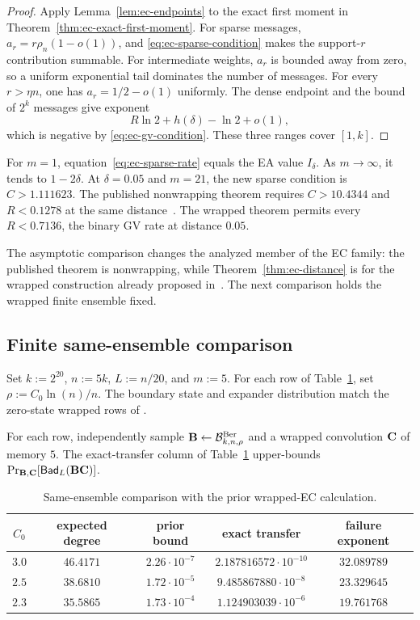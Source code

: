 \begin{proof}
Apply Lemma~\ref{lem:ec-endpoints} to the exact first moment in
Theorem~\ref{thm:ec-exact-first-moment}.  For sparse messages,
$a_r=r\rho_n(1-o(1))$, and \eqref{eq:ec-sparse-condition} makes the
support-$r$ contribution summable.  For intermediate weights, $a_r$ is
bounded away from zero, so a uniform exponential tail dominates the number
of messages.  For every $r>\eta n$, one has $a_r=1/2-o(1)$ uniformly.  The
dense endpoint and the bound of $2^k$ messages give exponent
\[
 R\ln2+h(\delta)-\ln2+o(1),
\]
which is negative by \eqref{eq:ec-gv-condition}.  These three ranges cover
$[1,k]$.
\end{proof}

For $m=1$, equation~\eqref{eq:ec-sparse-rate} equals the EA value
$I_\delta$.  As $m\to\infty$, it tends to $1-2\delta$.  At
$\delta=0.05$ and $m=21$, the new sparse condition is $C>1.111623$.
The published nonwrapping theorem requires $C>10.4344$ and $R<0.1278$ at the
same distance~\cite{EC}.  The wrapped theorem permits every $R<0.7136$, the
binary GV rate at distance $0.05$.

The asymptotic comparison changes the analyzed member of the EC family: the
published theorem is nonwrapping, while Theorem~\ref{thm:ec-distance} is for
the wrapped construction already proposed in~\cite{EC}.  The next comparison
holds the wrapped finite ensemble fixed.

\subsection{Finite same-ensemble comparison}

Set $k:=2^{20}$, $n:=5k$, $L:=n/20$, and $m:=5$.  For each row of
Table~\ref{tab:ec-same-ensemble}, set $\rho:=C_0\ln(n)/n$.  The boundary state
and expander distribution match the zero-state wrapped rows of
\cite[Table~4]{EC}.

\begin{theorem}
\label{thm:ec-finite-comparison}
For each row, independently sample
$\mathbf B\gets\mathcal B^{\mathrm{Ber}}_{k,n,\rho}$ and a wrapped convolution
$\mathbf C$ of memory $5$.  The exact-transfer column of
Table~\ref{tab:ec-same-ensemble} upper-bounds
$\Pr_{\mathbf B,\mathbf C}[\mathsf{Bad}_L(\mathbf B\mathbf C)]$.
\end{theorem}

\begin{table}[t]
\centering
\caption{Same-ensemble comparison with the prior wrapped-EC calculation.}
\label{tab:ec-same-ensemble}
\begin{tabular}{@{}ccccc@{}}
\toprule
$C_0$ & expected degree & prior bound & exact transfer & failure exponent \\
\midrule
$3.0$ & $46.4171$ & $2.26\cdot10^{-7}$ & $2.187816572\cdot10^{-10}$ & $32.089789$ \\
$2.5$ & $38.6810$ & $1.72\cdot10^{-5}$ & $9.485867880\cdot10^{-8}$ & $23.329645$ \\
$2.3$ & $35.5865$ & $1.73\cdot10^{-4}$ & $1.124903039\cdot10^{-6}$ & $19.761768$ \\
\bottomrule
\end{tabular}
\end{table}

